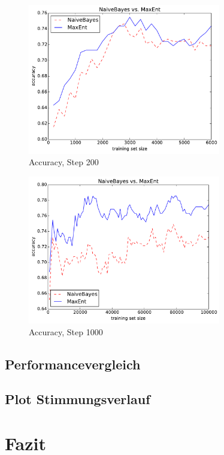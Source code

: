 \documentclass[12pt, oneside]{report}   	%
\begin{document}
\begin{figure}[htbp]
\begin{center}
\includegraphics[width=0.75\textwidth]{bilder/cmp_nb_vs_me_S200_M6000.pdf}
\caption{Accuracy, Step 200}
\label{img:acc2}
\end{center}
\end{figure}

\begin{figure}[htbp]
\begin{center}
\includegraphics[width=0.75\textwidth]{bilder/cmp_nb_vs_me_S1000_M100000.pdf}
\caption{Accuracy, Step 1000}
\label{img:acc3}
\end{center}
\end{figure}


\section{Performancevergleich}
\section{Plot Stimmungsverlauf}


\chapter{Fazit}
\end{document}
